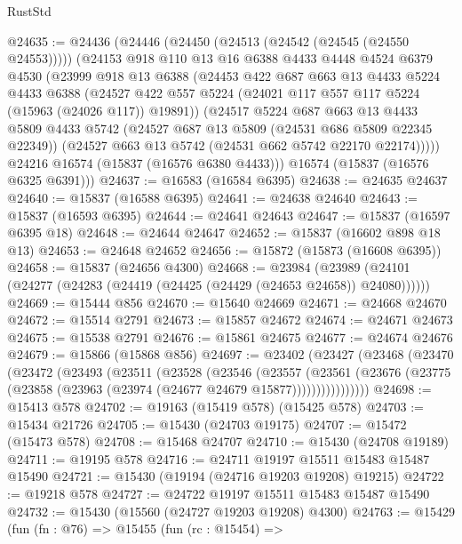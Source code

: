 \begin{lexlean}{RustStd}
\begin{coremodule}
{\begin{coremodule}
{{{{{{{{{{{{{{{{{{{{{{{{{{{{{{{{{{{{{{{{{{{{{{{{{{{{{{{{{{{{@24635 := @24436
    (@24446
      (@24450 (@24513 (@24542 (@24545 (@24550 @24553)))))
      (@24153
        @918
        @110
        @13
        @16
        @6388
        @4433
        @4448
        @4524
        @6379
        @4530
        (@23999
          @918
          @13
          @6388
          (@24453
            @422
            @687
            @663
            @13
            @4433
            @5224
            @4433
            @6388
            (@24527 @422 @557 @5224 (@24021 @117 @557 @117 @5224 (@15963 (@24026 @117)) @19891))
            (@24517
              @5224
              @687
              @663
              @13
              @4433
              @5809
              @4433
              @5742
              (@24527 @687 @13 @5809 (@24531 @686 @5809 @22345 @22349))
              (@24527 @663 @13 @5742 (@24531 @662 @5742 @22170 @22174)))))
        @24216
        @16574
        (@15837 (@16576 @6380 @4433)))
      @16574
      (@15837 (@16576 @6325 @6391)))
@24637 := @16583 (@16584 @6395)
@24638 := @24635 @24637
@24640 := @15837 (@16588 @6395)
@24641 := @24638 @24640
@24643 := @15837 (@16593 @6395)
@24644 := @24641 @24643
@24647 := @15837 (@16597 @6395 @18)
@24648 := @24644 @24647
@24652 := @15837 (@16602 @898 @18 @13)
@24653 := @24648 @24652
@24656 := @15872 (@15873 (@16608 @6395))
@24658 := @15837 (@24656 @4300)
@24668 := @23984
    (@23989 (@24101 (@24277 (@24283 (@24419 (@24425 (@24429 (@24653 @24658)) @24080))))))
@24669 := @15444 @856
@24670 := @15640 @24669
@24671 := @24668 @24670
@24672 := @15514 @2791
@24673 := @15857 @24672
@24674 := @24671 @24673
@24675 := @15538 @2791
@24676 := @15861 @24675
@24677 := @24674 @24676
@24679 := @15866 (@15868 @856)
@24697 := @23402
    (@23427
      (@23468
        (@23470
          (@23472
            (@23493
              (@23511
                (@23528
                  (@23546
                    (@23557
                      (@23561
                        (@23676
                          (@23775 (@23858 (@23963 (@23974 (@24677 @24679 @15877))))))))))))))))
@24698 := @15413 @578
@24702 := @19163 (@15419 @578) (@15425 @578)
@24703 := @15434 @21726
@24705 := @15430 (@24703 @19175)
@24707 := @15472 (@15473 @578)
@24708 := @15468 @24707
@24710 := @15430 (@24708 @19189)
@24711 := @19195 @578
@24716 := @24711 @19197 @15511 @15483 @15487 @15490
@24721 := @15430 (@19194 (@24716 @19203 @19208) @19215)
@24722 := @19218 @578
@24727 := @24722 @19197 @15511 @15483 @15487 @15490
@24732 := @15430 (@15560 (@24727 @19203 @19208) @4300)
@24763 := @15429
    (fun (fn : @76) =>
    @15455
      (fun (rc : @15454) =>
}}}}}}}}}}}}}}}}}}}}}}}}}}}}}}}}}}}}}}}}}}}}}}}}}}}}}}}}}}}}
\end{coremodule}}
\end{coremodule}
\end{lexlean}
